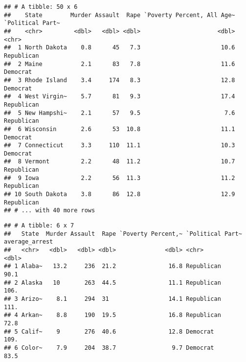 \documentclass[]{article}
\newenvironment{Shaded}{\begin{snugshade}}{\end{snugshade}}
\newcommand{\CommentTok}[1]{\textcolor[rgb]{0.56,0.35,0.01}{\textit{#1}}}
\newcommand{\DataTypeTok}[1]{\textcolor[rgb]{0.13,0.29,0.53}{#1}}
\newcommand{\DecValTok}[1]{\textcolor[rgb]{0.00,0.00,0.81}{#1}}
\newcommand{\KeywordTok}[1]{\textcolor[rgb]{0.13,0.29,0.53}{\textbf{#1}}}
\newcommand{\NormalTok}[1]{#1}
\newcommand{\OperatorTok}[1]{\textcolor[rgb]{0.81,0.36,0.00}{\textbf{#1}}}
\newcommand{\StringTok}[1]{\textcolor[rgb]{0.31,0.60,0.02}{#1}}
\begin{document}
\begin{Shaded}
\end{Shaded}

\begin{verbatim}
## # A tibble: 50 x 6
##    State        Murder Assault  Rape `Poverty Percent, All Age~ `Political Part~
##    <chr>         <dbl>   <dbl> <dbl>                      <dbl> <chr>           
##  1 North Dakota    0.8      45   7.3                       10.6 Republican      
##  2 Maine           2.1      83   7.8                       11.6 Democrat        
##  3 Rhode Island    3.4     174   8.3                       12.8 Democrat        
##  4 West Virgin~    5.7      81   9.3                       17.4 Republican      
##  5 New Hampshi~    2.1      57   9.5                        7.6 Republican      
##  6 Wisconsin       2.6      53  10.8                       11.1 Democrat        
##  7 Connecticut     3.3     110  11.1                       10.3 Democrat        
##  8 Vermont         2.2      48  11.2                       10.7 Republican      
##  9 Iowa            2.2      56  11.3                       11.2 Republican      
## 10 South Dakota    3.8      86  12.8                       12.9 Republican      
## # ... with 40 more rows
\end{verbatim}

\begin{Shaded}
\end{Shaded}

\begin{verbatim}
## # A tibble: 6 x 7
##   State  Murder Assault  Rape `Poverty Percent,~ `Political Part~ average_arrest
##   <chr>   <dbl>   <dbl> <dbl>              <dbl> <chr>                     <dbl>
## 1 Alaba~   13.2     236  21.2               16.8 Republican                 90.1
## 2 Alaska   10       263  44.5               11.1 Republican                106. 
## 3 Arizo~    8.1     294  31                 14.1 Republican                111. 
## 4 Arkan~    8.8     190  19.5               16.8 Republican                 72.8
## 5 Calif~    9       276  40.6               12.8 Democrat                  109. 
## 6 Color~    7.9     204  38.7                9.7 Democrat                   83.5
\end{verbatim}
\end{document}
